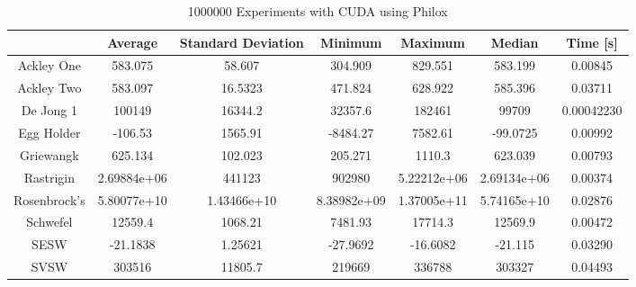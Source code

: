 \documentclass{article}
\begin{document}
        \begin{table}[h]
            \begin{centering}
                \begin{tabular}{|c||c|c|c|c|c|c|}
                    \hline
                                & Average & Standard Deviation & Minimum & Maximum & Median & Time [s] \\
                    \hline
                    \hline
                    Ackley One & 583.075 & 58.607 & 304.909 & 829.551 & 583.199 & 0.00845 \\
                    \hline
                    Ackley Two & 583.097 & 16.5323 & 471.824 & 628.922 & 585.396 & 0.03711 \\
                    \hline
                    De Jong 1 & 100149 & 16344.2 & 32357.6 & 182461 & 99709 & 0.00042230\\
                    \hline
                    Egg Holder & -106.53 & 1565.91 & -8484.27 & 7582.61 & -99.0725 & 0.00992 \\
                    \hline
                    Griewangk & 625.134 & 102.023 & 205.271 & 1110.3 & 623.039 & 0.00793 \\
                    \hline
                    Rastrigin & 2.69884e+06 & 441123 & 902980 & 5.22212e+06 & 2.69134e+06 & 0.00374 \\
                    \hline
                    Rosenbrock's & 5.80077e+10 & 1.43466e+10 & 8.38982e+09 & 1.37005e+11 & 5.74165e+10 & 0.02876 \\
                    \hline
                    Schwefel & 12559.4 & 1068.21 & 7481.93 & 17714.3 & 12569.9 & 0.00472 \\
                    \hline
                    SESW & -21.1838 & 1.25621 & -27.9692 & -16.6082 & -21.115 & 0.03290\\
                    \hline
                    SVSW & 303516 & 11805.7 & 219669 & 336788 & 303327 & 0.04493\\
                    \hline
                \end{tabular}
                \caption{1000000 Experiments with CUDA using Philox}
            \end{centering}
            \end{table}
\end{document}
